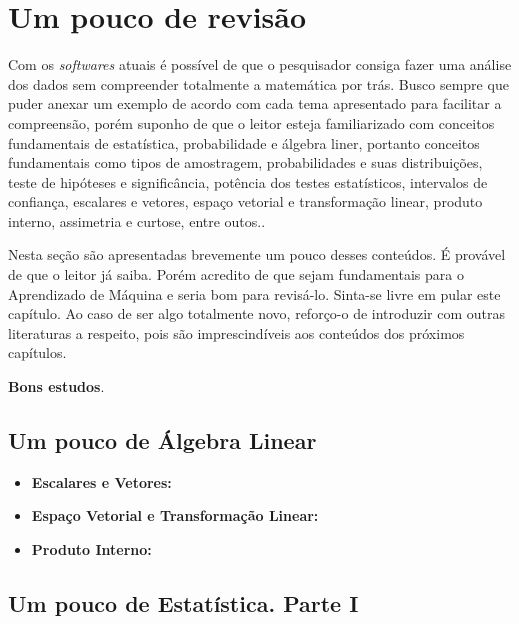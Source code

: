 \documentclass[
]{book}
\begin{document}
\hypertarget{dicio}{%
\chapter{Um pouco de revisão}\label{dicio}}

Com os \emph{softwares} atuais é possível de que o pesquisador consiga fazer uma análise dos dados sem compreender totalmente a matemática por trás. Busco sempre que puder anexar um exemplo de acordo com cada tema apresentado para facilitar a compreensão, porém suponho de que o leitor esteja familiarizado com conceitos fundamentais de estatística, probabilidade e álgebra liner, portanto conceitos fundamentais como tipos de amostragem, probabilidades e suas distribuições, teste de hipóteses e significância, potência dos testes estatísticos, intervalos de confiança, escalares e vetores, espaço vetorial e transformação linear, produto interno, assimetria e curtose, entre outos..

Nesta seção são apresentadas brevemente um pouco desses conteúdos. É provável de que o leitor já saiba. Porém acredito de que sejam fundamentais para o Aprendizado de Máquina e seria bom para revisá-lo. Sinta-se livre em pular este capítulo. Ao caso de ser algo totalmente novo, reforço-o de introduzir com outras literaturas a respeito, pois são imprescindíveis aos conteúdos dos próximos capítulos.

\textbf{Bons estudos}.

\hypertarget{um-pouco-de-uxe1lgebra-linear}{%
\section{Um pouco de Álgebra Linear}\label{um-pouco-de-uxe1lgebra-linear}}

\begin{itemize}
\item
  \textbf{Escalares e Vetores:}
\item
  \textbf{Espaço Vetorial e Transformação Linear:}
\item
  \textbf{Produto Interno:}
\end{itemize}

\hypertarget{um-pouco-de-estatuxedstica.-parte-i}{%
\section{Um pouco de Estatística. Parte I}\label{um-pouco-de-estatuxedstica.-parte-i}}
\end{document}
